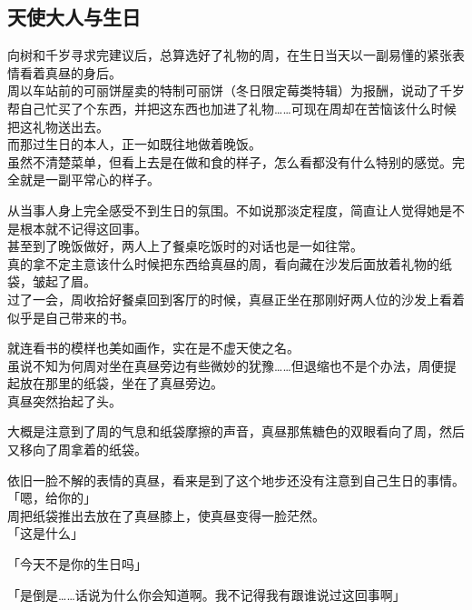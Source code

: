 \subsection{天使大人与生日}

向树和千岁寻求完建议后，总算选好了礼物的周，在生日当天以一副易懂的紧张表情看着真昼的身后。\\

周以车站前的可丽饼屋卖的特制可丽饼（冬日限定莓类特辑）为报酬，说动了千岁帮自己忙买了个东西，并把这东西也加进了礼物……可现在周却在苦恼该什么时候把这礼物送出去。\\

而那过生日的本人，正一如既往地做着晚饭。\\

虽然不清楚菜单，但看上去是在做和食的样子，怎么看都没有什么特别的感觉。完全就是一副平常心的样子。

从当事人身上完全感受不到生日的氛围。不如说那淡定程度，简直让人觉得她是不是根本就不记得这回事。\\

甚至到了晚饭做好，两人上了餐桌吃饭时的对话也是一如往常。\\

真的拿不定主意该什么时候把东西给真昼的周，看向藏在沙发后面放着礼物的纸袋，皱起了眉。\\

过了一会，周收拾好餐桌回到客厅的时候，真昼正坐在那刚好两人位的沙发上看着似乎是自己带来的书。

就连看书的模样也美如画作，实在是不虚天使之名。\\

虽说不知为何周对坐在真昼旁边有些微妙的犹豫……但退缩也不是个办法，周便提起放在那里的纸袋，坐在了真昼旁边。\\

真昼突然抬起了头。

大概是注意到了周的气息和纸袋摩擦的声音，真昼那焦糖色的双眼看向了周，然后又移向了周拿着的纸袋。

依旧一脸不解的表情的真昼，看来是到了这个地步还没有注意到自己生日的事情。\\

「嗯，给你的」\\

周把纸袋推出去放在了真昼膝上，使真昼变得一脸茫然。\\

「这是什么」

「今天不是你的生日吗」

「是倒是……话说为什么你会知道啊。我不记得我有跟谁说过这回事啊」\\

